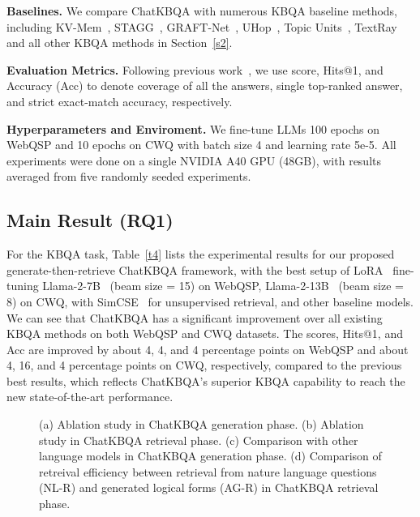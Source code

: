 \documentclass{article} \usepackage{iclr2024_conference,times}
\begin{document}
\textbf{Baselines. } We compare ChatKBQA with numerous KBQA baseline methods, including KV-Mem~\citep{KV-Mem}, STAGG~\citep{STAGG}, GRAFT-Net~\citep{GRAFT-Net}, UHop~\citep{UHop}, Topic Units~\citep{TopicUnits}, TextRay~\citep{TextRay} and all other KBQA methods in Section~\ref{s2}. 



\textbf{Evaluation Metrics. }
Following previous work~\citep{GMT-KBQA,TIARA,DECAF}, we use  score, Hits@1, and Accuracy (Acc) to denote coverage of all the answers, single top-ranked answer, and strict exact-match accuracy, respectively.

\textbf{Hyperparameters and Enviroment. }
We fine-tune LLMs 100 epochs on WebQSP and 10 epochs on CWQ with batch size 4 and learning rate 5e-5. All experiments were done on a single NVIDIA A40 GPU (48GB), with results averaged from five randomly seeded experiments. 



\subsection{Main Result (RQ1)}

For the KBQA task, Table~\ref{t4} lists the experimental results for our proposed generate-then-retrieve ChatKBQA framework, with the best setup of LoRA~\citep{LoRA} fine-tuning Llama-2-7B~\citep{Llama2} (beam size = 15) on WebQSP, Llama-2-13B~\citep{Llama2} (beam size = 8) on CWQ, with SimCSE~\citep{SimCSE} for unsupervised retrieval, and other baseline models. We can see that ChatKBQA has a significant improvement over all existing KBQA methods on both WebQSP and CWQ datasets. The  scores, Hits@1, and Acc are improved by about 4, 4, and 4 percentage points on WebQSP and about 4, 16, and 4 percentage points on CWQ, respectively, compared to the previous best results, which reflects ChatKBQA's superior KBQA capability to reach the new state-of-the-art performance.



\begin{figure}[h!t]
    \vspace{-3mm}
    \centering
	\caption{(a) Ablation study in ChatKBQA generation phase. (b) Ablation study in ChatKBQA retrieval phase. (c) Comparison with other language models in ChatKBQA generation phase. (d) Comparison of retreival efficiency between retrieval from nature language questions (NL-R) and generated logical forms (AG-R) in ChatKBQA retrieval phase.}
	\label{f3}
\end{figure}
\end{document}
